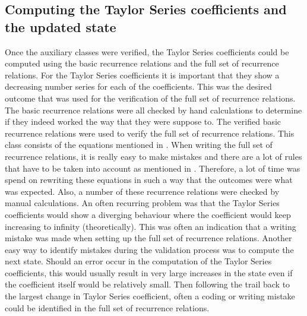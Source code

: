 \subsection{Computing the Taylor Series coefficients and the updated state}
\label{subsec:TaySerCoefverval}
Once the auxiliary classes were verified, the Taylor Series coefficients could be computed using the basic recurrence relations and the full set of recurrence relations. For the Taylor Series coefficients it is important that they show a decreasing number series for each of the coefficients. This was the desired outcome that was used for the verification of the full set of recurrence relations. The basic recurrence relations were all checked by hand calculations to determine if they indeed worked the way that they were suppose to. The verified basic recurrence relations were used to verify the full set of recurrence relations. This class consists of the equations mentioned in . When writing the full set of recurrence relations, it is really easy to make mistakes and there are a lot of rules that have to be taken into account as mentioned in . Therefore, a lot of time was spend on rewriting these equations in such a way that the outcomes were what was expected. Also, a number of these recurrence relations were checked by manual calculations. An often recurring problem was that the Taylor Series coefficients would show a diverging behaviour where the coefficient would keep increasing to infinity (theoretically). This was often an indication that a writing mistake was made when setting up the full set of recurrence relations. Another easy way to identify mistakes during the validation process was to compute the next state. Should an error occur in the computation of the Taylor Series coefficients, this would usually result in very large increases in the state even if the coefficient itself would be relatively small. Then following the trail back to the largest change in Taylor Series coefficient, often a coding or writing mistake could be identified in the full set of recurrence relations. 

